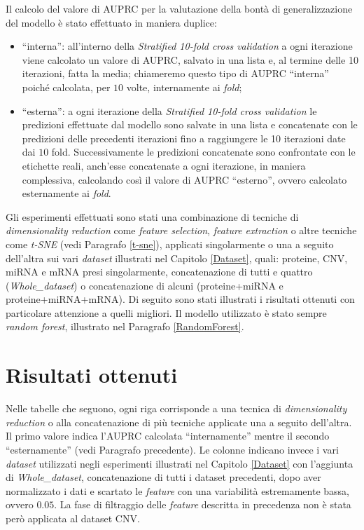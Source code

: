\documentclass[12pt,italian]{report}
\begin{document}
	Il calcolo del valore di AUPRC per la valutazione della bontà di generalizzazione del modello è stato effettuato in maniera duplice:
	\begin{itemize}
		\item ``interna'': all'interno della \textit{Stratified 10-fold cross validation} a ogni iterazione viene calcolato un valore di AUPRC, salvato in una lista e, al termine delle 10 iterazioni, fatta la media; chiameremo questo tipo di AUPRC ``interna'' poiché calcolata, per $10$ volte, internamente ai \textit{fold};
		\item ``esterna'': a ogni iterazione della \textit{Stratified 10-fold cross validation} le predizioni effettuate dal modello sono salvate in una lista e concatenate con le predizioni delle precedenti iterazioni fino a raggiungere le 10 iterazioni date dai $10$ fold. Successivamente le predizioni concatenate sono confrontate con le etichette reali, anch'esse concatenate a ogni iterazione, in maniera complessiva, calcolando così il valore di AUPRC ``esterno'', ovvero calcolato esternamente ai \textit{fold}.
	\end{itemize}

	Gli esperimenti effettuati sono stati una combinazione di tecniche di \textit{dimensionality reduction} come \textit{feature selection}, \textit{feature extraction} o altre tecniche come \textit{t-SNE} (vedi Paragrafo \ref{t-sne}), applicati singolarmente o una a seguito dell'altra sui vari \textit{dataset} illustrati nel Capitolo \ref{Dataset}, quali: proteine, CNV, miRNA e mRNA presi singolarmente, concatenazione di tutti e quattro (\textit{Whole\_dataset}) o concatenazione di alcuni (proteine+miRNA e proteine+miRNA+mRNA). Di seguito sono stati illustrati i risultati ottenuti con particolare attenzione a quelli migliori. Il modello utilizzato è stato sempre \textit{random forest}, illustrato nel Paragrafo \ref{RandomForest}.
	
	\section{Risultati ottenuti}
	\label{risultati}
	Nelle tabelle che seguono, ogni riga corrisponde a una tecnica di \textit{dimensionality reduction} o alla concatenazione di più tecniche applicate una a seguito dell'altra. Il primo valore indica l'AUPRC calcolata ``internamente'' mentre il secondo ``esternamente'' (vedi Paragrafo precedente). Le colonne indicano invece i vari \textit{dataset} utilizzati negli esperimenti illustrati nel Capitolo \ref{Dataset} con l'aggiunta di \textit{Whole\_dataset}, concatenazione di tutti i dataset precedenti, dopo aver normalizzato i dati e scartato le \textit{feature} con una variabilità estremamente bassa, ovvero $0.05$. 
	La fase di filtraggio delle \textit{feature} descritta in precedenza non è stata però applicata al dataset CNV. 
	
\end{document}
